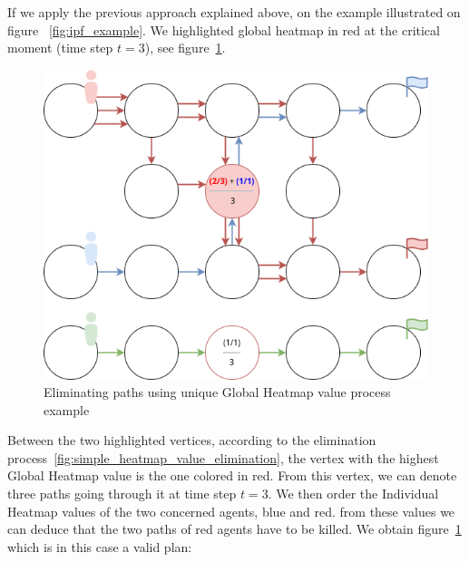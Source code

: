 If we apply the previous approach explained above, on the example illustrated on figure ~\ref{fig:ipf_example}. We highlighted global heatmap in red at the critical moment (time step \(t=3\)), see figure~\ref{fig:simple_heatmap_value_elimination_example}. 

\begin{figure}[H]
    \centering
    \caption{Eliminating paths using unique Global Heatmap value process example}\label{fig:simple_heatmap_value_elimination_example}
    \includegraphics[width=\widthimg]{img/pe_one_heatmap_value_example.drawio.png}
\end{figure}

Between the two highlighted vertices, according to the elimination process~\ref{fig:simple_heatmap_value_elimination}, the vertex with the highest Global Heatmap value is the one colored in red. From this vertex, we can denote three paths going through it at time step \(t=3\). We then order the Individual Heatmap values of the two concerned agents, blue and red. from these values we can deduce that the two paths of red agents have to be killed. We obtain figure~\ref{fig:simple_heatmap_value_elimination_example} which is in this case a valid plan:

